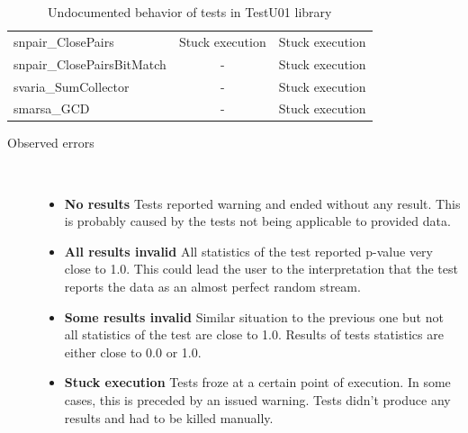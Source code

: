 \documentclass[
  digital,  	%
  color,		%
  oneside,   	%
  12pt,
  nocover,
  notable,
  nolof,
  nolot,
]{fithesis3}
\newenvironment{titlemize}[1]
{
	\begin{description}
	\item[#1]\
	\begin{itemize}
}
{
	\end{itemize}
 	\end{description}
}
\begin{document}
\begin{table}[h!]
\begin{nomar}
\begin{tabular}{l || c | c }
snpair\_ClosePairs                 & Stuck execution          & Stuck execution          \\
snpair\_ClosePairsBitMatch         & -                        & Stuck execution          \\
svaria\_SumCollector               & -                        & Stuck execution          \\
smarsa\_GCD                        & -                        & Stuck execution          \\                                       
\end{tabular}
\end{nomar}  
\caption{Undocumented behavior of tests in TestU01 library}
\label{tab:testu01_errors}                                                                                           
\end{table}

\begin{titlemize}{Observed errors}
\item \textbf{No results} Tests reported warning and ended without any result. This is probably caused by the tests not being applicable to provided data.
\item \textbf{All results invalid}  All statistics of the test reported p-value very close to 1.0. This could lead the user to the interpretation that the test reports the data as an almost perfect random stream.
\item \textbf{Some results invalid} Similar situation to the previous one but not all statistics of the test are close to 1.0. Results of tests statistics are either close to 0.0 or 1.0.
\item \textbf{Stuck execution} Tests froze at a certain point of execution. In some cases, this is preceded by an issued warning. Tests didn't produce any results and had to be killed manually.
\end{titlemize}
\end{document}
